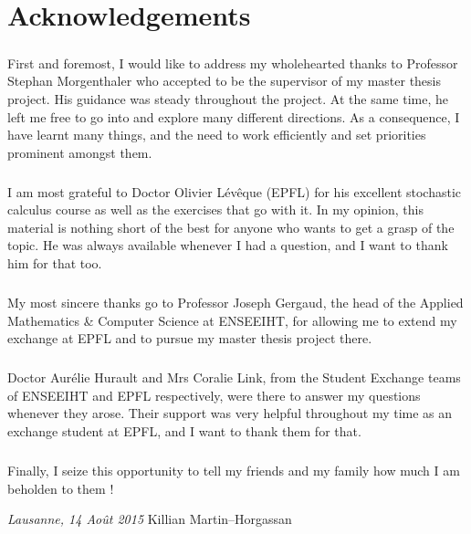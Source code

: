 \chapter*{Acknowledgements}

\bigskip
\paragraph{}
First and foremost, I would like to address my wholehearted thanks to Professor Stephan Morgenthaler who accepted to be the supervisor of my master thesis project. His guidance was steady throughout the project. At the same time, he left me free to go into and explore many different directions. As a consequence, I have learnt many things, and the need to work efficiently and set priorities prominent amongst them.
\paragraph{}
I am most grateful to Doctor Olivier Lévêque (EPFL) for his excellent stochastic calculus course as well as the exercises that go with it. In my opinion, this material is nothing short of the best for anyone who wants to get a grasp of the topic. He was always available whenever I had a question, and I want to thank him for that too.
\paragraph{}
My most sincere thanks go to Professor Joseph Gergaud, the head of the Applied Mathematics \& Computer Science at ENSEEIHT, for allowing me to extend my exchange at EPFL and to pursue my master thesis project there.
\paragraph{}
Doctor Aurélie Hurault and Mrs Coralie Link, from the Student Exchange teams of ENSEEIHT and EPFL respectively, were there to answer my questions whenever they arose. Their support was very helpful throughout my time as an exchange student at EPFL, and I want to thank them for that.
\paragraph{}
Finally, I seize this opportunity to tell my friends and my family how much I am beholden to them !
\bigskip
 
\noindent\textit{Lausanne, 14 Ao\^{u}t 2015}
\hfill Killian Martin--Horgassan
